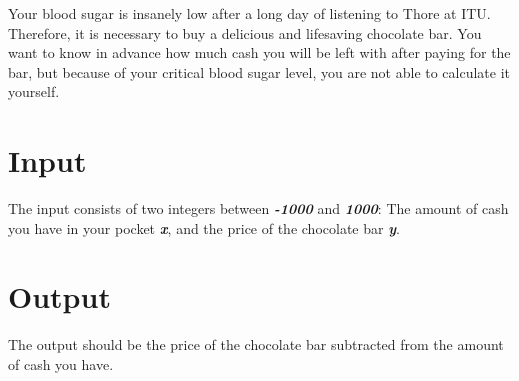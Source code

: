 

Your blood sugar is insanely low after a long day of listening to Thore at ITU. Therefore, it is necessary to buy a delicious and lifesaving chocolate bar. You want to know in advance how much cash you will be left with after paying for the bar, but because of your critical blood sugar level, you are not able to calculate it yourself. 

\section*{Input}

The input consists of two integers between \textbf{\textit{-1000}} and \textbf{\textit{1000}}: The amount of cash you have in your pocket \textbf{\textit{x}}, and the price of the chocolate bar \textbf{\textit{y}}.

\section*{Output}

The output should be the price of the chocolate bar subtracted from the amount of cash you have.